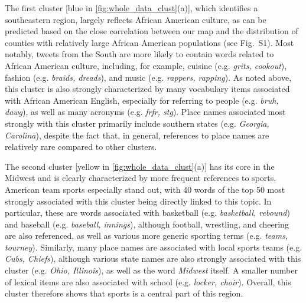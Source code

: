 \documentclass[../thesis.tex]{subfiles}
\begin{document}
The first cluster [blue in \cref{fig:whole_data_clust}(a)], which identifies a
southeastern region, largely reflects African American culture, as can be predicted
based on the close correlation between our map and the distribution of counties with
relatively large African American populations (see Fig.~S1). Most notably, tweets from
the South are more likely to contain words related to African American culture,
including, for example, cuisine (e.g. \textit{grits, cookout}), fashion (e.g.
\textit{braids, dreads}), and music (e.g. \textit{rappers, rapping}). As noted above,
this cluster is also strongly characterized by many vocabulary items associated with
African American English, especially for referring to people (e.g. \textit{bruh, dawg}),
as well as many acronyms (e.g. \textit{frfr, stg}). Place names associated most strongly
with this cluster primarily include southern states (e.g. \textit{Georgia, Carolina}),
despite the fact that, in general, references to place names are relatively rare
compared to other clusters.

The second cluster [yellow in \cref{fig:whole_data_clust}(a)] has its core in the
Midwest and is clearly characterized by more frequent references to sports. American
team sports especially stand out, with 40 words of the top 50 most strongly associated
with this cluster being directly linked to this topic. In particular, these are words
associated with basketball (e.g. \textit{basketball, rebound}) and baseball (e.g.
\textit{baseball, innings}), although football, wrestling, and cheering are also
referenced, as well as various more generic sporting terms (e.g. \textit{teams,
tourney}). Similarly, many place names are associated with local sports teams (e.g.
\textit{Cubs, Chiefs}), although various state names are also strongly associated with
this cluster (e.g. \textit{Ohio, Illinois}), as well as the word \textit{Midwest}
itself.  A smaller number of lexical items are also associated with school (e.g.
\textit{locker, choir}). Overall, this cluster therefore shows that sports is a central
part of this region. 
\end{document}
